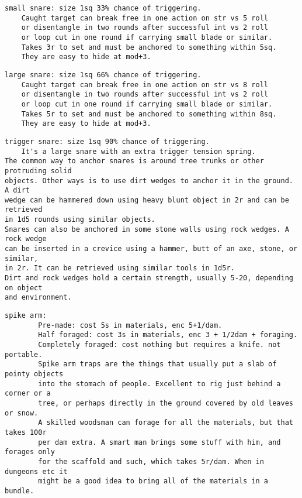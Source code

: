 \small \begin{samepage} \begin{verbatim}
small snare: size 1sq 33% chance of triggering.
    Caught target can break free in one action on str vs 5 roll
    or disentangle in two rounds after successful int vs 2 roll
    or loop cut in one round if carrying small blade or similar.
    Takes 3r to set and must be anchored to something within 5sq.
    They are easy to hide at mod+3.
\end{verbatim} \blocklistgap \begin{verbatim}
large snare: size 1sq 66% chance of triggering.
    Caught target can break free in one action on str vs 8 roll
    or disentangle in two rounds after successful int vs 2 roll
    or loop cut in one round if carrying small blade or similar.
    Takes 5r to set and must be anchored to something within 8sq.
    They are easy to hide at mod+3.
\end{verbatim} \blocklistgap \begin{verbatim}
trigger snare: size 1sq 90% chance of triggering.
    It's a large snare with an extra trigger tension spring.
The common way to anchor snares is around tree trunks or other protruding solid
objects. Other ways is to use dirt wedges to anchor it in the ground. A dirt
wedge can be hammered down using heavy blunt object in 2r and can be retrieved
in 1d5 rounds using similar objects. 
Snares can also be anchored in some stone walls using rock wedges. A rock wedge
can be inserted in a crevice using a hammer, butt of an axe, stone, or similar,
in 2r. It can be retrieved using similar tools in 1d5r. 
Dirt and rock wedges hold a certain strength, usually 5-20, depending on object 
and environment.
\end{verbatim} \blocklistgap \begin{verbatim}
spike arm:
        Pre-made: cost 5s in materials, enc 5+1/dam.
        Half foraged: cost 3s in materials, enc 3 + 1/2dam + foraging.
        Completely foraged: cost nothing but requires a knife. not portable.
        Spike arm traps are the things that usually put a slab of pointy objects
        into the stomach of people. Excellent to rig just behind a corner or a
        tree, or perhaps directly in the ground covered by old leaves or snow.
        A skilled woodsman can forage for all the materials, but that takes 100r
        per dam extra. A smart man brings some stuff with him, and forages only
        for the scaffold and such, which takes 5r/dam. When in dungeons etc it
        might be a good idea to bring all of the materials in a bundle.

\end{verbatim}
\end{samepage}
